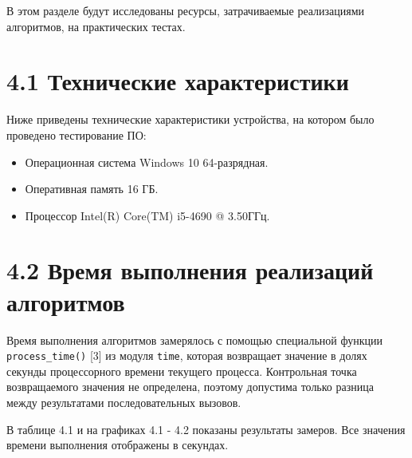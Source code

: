 \documentclass[12pt, a4paper]{report}
\begin{document}
В этом разделе будут исследованы ресурсы, затрачиваемые реализациями алгоритмов, на практических тестах.

\section*{4.1 Технические характеристики}

Ниже приведены технические характеристики устройства, на котором было проведено тестирование ПО:

\begin{itemize}
	\item Операционная система Windows 10 64-разрядная.
	\item Оперативная память 16 ГБ.
	\item Процессор Intel(R) Core(TM) i5-4690 @ 3.50ГГц.
\end{itemize}

\section*{4.2 Время выполнения реализаций алгоритмов}

Время выполнения алгоритмов замерялось с помощью специальной функции \verb|process_time()| [3] из модуля \verb|time|, которая возвращает значение в долях секунды процессорного времени текущего процесса. Контрольная точка возвращаемого значения не определена, поэтому допустима только разница между результатами последовательных вызовов.

В таблице 4.1 и на графиках 4.1 - 4.2 показаны результаты замеров. Все значения времени выполнения отображены в секундах.
\end{document}
